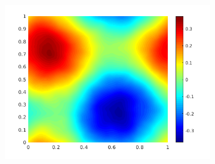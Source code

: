 \documentclass{article} %
\begin{document}
\begin{figure}[t]
\begin{subfigure}[b]{0.32\textwidth}
    \end{subfigure}
    \begin{subfigure}[b]{0.32\textwidth}
        \includegraphics[width=\textwidth]{figs/umean_approx.png}
    \end{subfigure}
    

\end{figure}
\end{document}
